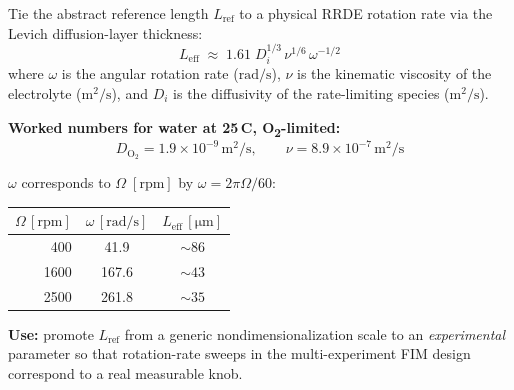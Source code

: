 \documentclass[11pt]{article}
\begin{document}
\begin{tcolorbox}[cardstyle={RRDE transport: Levich diffusion length}]
Tie the abstract reference length \(L_{\mathrm{ref}}\) to a physical
RRDE rotation rate via the Levich diffusion-layer thickness:
\[
  L_{\mathrm{eff}} \;\approx\;
   1.61\;D_i^{1/3}\,\nu^{1/6}\,\omega^{-1/2}
\]
where \(\omega\) is the angular rotation rate
(\(\si{\radian\per\second}\)), \(\nu\) is the kinematic viscosity of
the electrolyte
(\(\si{\meter\squared\per\second}\)), and \(D_i\) is the diffusivity
of the rate-limiting species
(\(\si{\meter\squared\per\second}\)).

\textbf{Worked numbers for water at 25\,\textdegree C, O\textsubscript{2}-limited:}
\[
  D_{\mathrm{O_2}} = 1.9\times 10^{-9}\,\si{\meter\squared\per\second},\qquad
  \nu = 8.9\times 10^{-7}\,\si{\meter\squared\per\second}
\]

\(\omega\) corresponds to \(\Omega \;[\mathrm{rpm}]\) by
\(\omega = 2\pi\Omega / 60\):
\begin{center}
\begin{tabular}{rcc}
\hline
\(\Omega\,[\mathrm{rpm}]\) & \(\omega\,[\si{\radian\per\second}]\) & \(L_{\mathrm{eff}}\,[\si{\micro\meter}]\) \\
\hline
400  & 41.9  & \(\sim 86\) \\
1600 & 167.6 & \(\sim 43\) \\
2500 & 261.8 & \(\sim 35\) \\
\hline
\end{tabular}
\end{center}

\textbf{Use:} promote \(L_{\mathrm{ref}}\) from a generic
nondimensionalization scale to an \emph{experimental} parameter so
that rotation-rate sweeps in the multi-experiment FIM design
correspond to a real measurable knob.
\end{tcolorbox}
\end{document}
